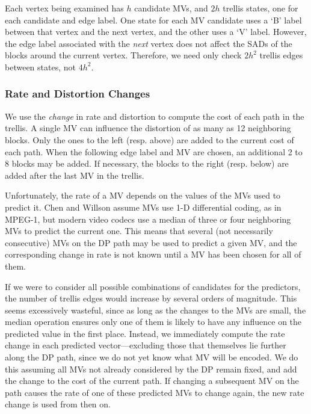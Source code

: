 \documentclass[11pt,letterpaper]{article}
\begin{document}
Each vertex being examined has $h$ candidate MVs, and $2h$ trellis states, one
 for each candidate and edge label.
One state for each MV candidate uses a `B' label between that vertex and the
 next vertex, and the other uses a `V' label.
However, the edge label associated with the \textit{next} vertex does not
 affect the SADs of the blocks around the current vertex.
Therefore, we need only check $2h^2$ trellis edges between states, not $4h^2$.

\subsubsection{Rate and Distortion Changes}

We use the \textit{change} in rate and distortion to compute the cost of each
 path in the trellis.
A single MV can influence the distortion of as many as 12 neighboring blocks.
Only the ones to the left (resp. above) are added to the current cost of each
 path.
When the following edge label and MV are chosen, an additional 2 to 8 blocks
 may be added.
If necessary, the blocks to the right (resp. below) are added after the last
 MV in the trellis.

Unfortunately, the rate of a MV depends on the values of the MVs used to
 predict it.
Chen and Willson assume MVs use 1-D differential coding, as in MPEG-1, but
 modern video codecs use a median of three or four neighboring MVs to predict
 the current one.
This means that several (not necessarily consecutive) MVs on the DP path may be
 used to predict a given MV, and the corresponding change in rate is not known
 until a MV has been chosen for all of them.

If we were to consider all possible combinations of candidates for the
 predictors, the number of trellis edges would increase by several orders of
 magnitude.
This seems excessively wasteful, since as long as the changes to the MVs are
 small, the median operation ensures only one of them is likely to have any
 influence on the predicted value in the first place.
Instead, we immediately compute the rate change in each predicted
 vector---excluding those that themselves lie further along the DP path, since
 we do not yet know what MV will be encoded.
We do this assuming all MVs not already considered by the DP remain fixed, and
 add the change to the cost of the current path.
If changing a subsequent MV on the path causes the rate of one of these
 predicted MVs to change again, the new rate change is used from then on.
\end{document}
